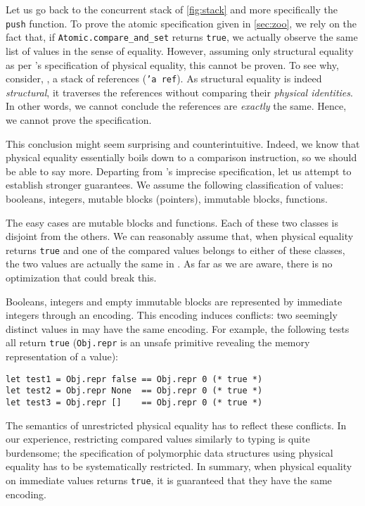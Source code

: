 Let us go back to the concurrent stack of \cref{fig:stack} and more specifically the \texttt{push} function.
To prove the atomic specification given in \cref{sec:zoo}, we rely on the fact that, if \texttt{Atomic.compare_and_set} returns \texttt{true}, we actually observe the same list of values in the sense of \Rocq equality.
However, assuming only structural equality as per \OCaml's specification of physical equality, this cannot be proven.
To see why, consider, \eg, a stack of references (\texttt{'a ref}).
As structural equality is indeed \emph{structural}, it traverses the references without comparing their \emph{physical identities}.
In other words, we cannot conclude the references are \emph{exactly} the same.
Hence, we cannot prove the specification.

This conclusion might seem surprising and counterintuitive.
Indeed, we know that physical equality essentially boils down to a comparison instruction, so we should be able to say more.
Departing from \OCaml's imprecise specification, let us attempt to establish stronger guarantees.
We assume the following classification of values: booleans, integers, mutable blocks (pointers), immutable blocks, functions.

The easy cases are mutable blocks and functions.
Each of these two classes is disjoint from the others.
We can reasonably assume that, when physical equality returns \texttt{true} and one of the compared values belongs to either of these classes, the two values are actually the same in \Rocq.
As far as we are aware, there is no optimization that could break this.

Booleans, integers and empty immutable blocks are represented by immediate integers through an encoding.
This encoding induces conflicts: two seemingly distinct values in \Rocq may have the same encoding.
For example, the following tests all return \texttt{true} (\texttt{Obj.repr} is an unsafe primitive revealing the memory representation of a value):

\begin{verbatim}
let test1 = Obj.repr false == Obj.repr 0 (* true *)
let test2 = Obj.repr None  == Obj.repr 0 (* true *)
let test3 = Obj.repr []    == Obj.repr 0 (* true *)
\end{verbatim}

The semantics of unrestricted physical equality has to reflect these conflicts.
In our experience, restricting compared values similarly to typing is quite burdensome; the specification of polymorphic data structures using physical equality has to be systematically restricted.
In summary, when physical equality on immediate values returns \texttt{true}, it is guaranteed that they have the same encoding.

